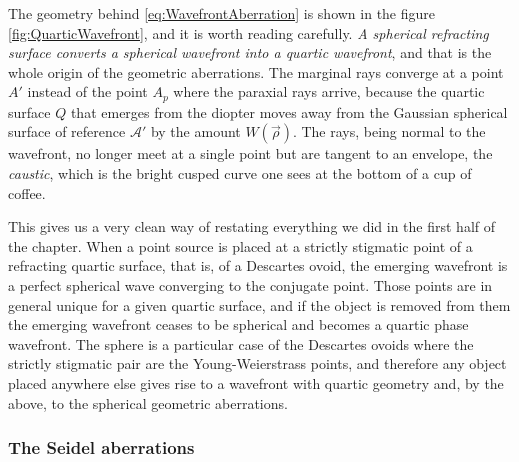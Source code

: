                     The geometry behind \ref{eq:WavefrontAberration} is shown in the figure \ref{fig:QuarticWavefront}, and it is worth reading carefully. \textit{A spherical refracting surface converts a spherical wavefront into a quartic wavefront}, and that is the whole origin of the geometric aberrations. The marginal rays converge at a point $A'$ instead of the point $A_p$ where the paraxial rays arrive, because the quartic surface $Q$ that emerges from the diopter moves away from the Gaussian spherical surface of reference $\mathcal{A}'$ by the amount $W(\vec{\rho})$. The rays, being normal to the wavefront, no longer meet at a single point but are tangent to an envelope, the \emph{caustic}, which is the bright cusped curve one sees at the bottom of a cup of coffee.

                    This gives us a very clean way of restating everything we did in the first half of the chapter. When a point source is placed at a strictly stigmatic point of a refracting quartic surface, that is, of a Descartes ovoid, the emerging wavefront is a perfect spherical wave converging to the conjugate point. Those points are in general unique for a given quartic surface, and if the object is removed from them the emerging wavefront ceases to be spherical and becomes a quartic phase wavefront. The sphere is a particular case of the Descartes ovoids where the strictly stigmatic pair are the Young-Weierstrass points, and therefore any object placed anywhere else gives rise to a wavefront with quartic geometry and, by the above, to the spherical geometric aberrations.

                \subsubsection{The Seidel aberrations}

